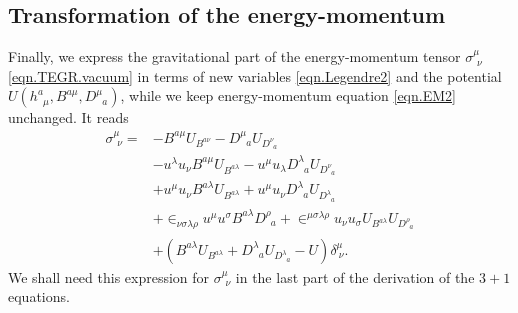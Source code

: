 \documentclass[
10pt, %
a4paper, %
oneside, %
twocolumn,
headinclude,footinclude, %
BCOR5mm, %
]{scrartcl}
\newcommand{\tetrsymbol}{h}
\newcommand{\tetr}[2]{\tetrsymbol^{#1}_{\phantom{#1}#2}}
\newcommand{\Dm}[2]{D_{\phantom{#2}#1}^{#2}}	%
\newcommand{\Bm}[2]{B^{#1#2}}	%
\newcommand{\Um}{U}%
\newcommand{\EM}[2]{\Sigma^{#1}_{\phantom{#1}#2}}
\newcommand{\EMmat}[2]{\sigma^{#1}_{\ \,#2}}
\newcommand{\LCsymb}{\bm{\in}}    %
\newcommand{\KD}[2]{\delta^{#1}_{\ #2}}
\begin{document}
	\subsection{Transformation of the energy-momentum}
	Finally, we express the gravitational part of the energy-momentum tensor $ {\EMmat{\mu}{\nu}} $ 
	\eqref{eqn.TEGR.vacuum} 
	in 
	terms of 
	new 
	variables 
	\eqref{eqn.Legendre2} and 
	the potential $ \Um(\tetr{a}{\mu},\Bm{a}{\mu},\Dm{a}{\mu}) $, while we keep energy-momentum 
	equation \eqref{eqn.EM2} unchanged. It reads
	\begin{align}\label{eqn.sigma.BD}
		{\EMmat{\mu}{\nu}} =
		& -\Bm{a}{\mu}\Um_{\Bm{a}{\nu}} - \Dm{a}{\mu}\Um_{\Dm{a}{\nu}} \nonumber\\
		& - u^\lambda u_\nu \Bm{a}{\mu} \Um_{\Bm{a}{\lambda}} 
		- u^\mu u_\lambda \Dm{a}{\lambda} \Um_{\Dm{a}{\nu}}
		\nonumber\\
		& + u^\mu u_\nu \Bm{a}{\lambda} \Um_{\Bm{a}{\lambda}} 
		+ u^\mu u_\nu \Dm{a}{\lambda} \Um_{\Dm{a}{\lambda}}
		\nonumber \\
		& + \LCsymb_{\nu\sigma\lambda\rho} u^\mu u^\sigma \Bm{a}{\lambda} \Dm{a}{\rho} 
		+ \LCsymb^{\mu\sigma\lambda\rho} u_\nu u_\sigma \Um_{\Bm{a}{\lambda}} 
		\Um_{\Dm{a}{\rho}} 
		\nonumber \\
		& + (\Bm{a}{\lambda} \Um_{\Bm{a}{\lambda}} + \Dm{a}{\lambda} \Um_{\Dm{a}{\lambda}} - 
		\Um) \KD{\mu}{\nu}. 
	\end{align}
	We shall need this expression for $ \EMmat{\mu}{\nu} $ in the last part of the derivation of 
	the $ 
	3+1 $ equations.
	
	
\end{document}
